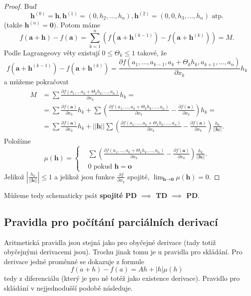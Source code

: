 \documentclass[../main.tex]{subfiles}
\begin{document}
\begin{proof}
	Buď
	\[\textbf{h}^{(0)} = \textbf{h}, \textbf{h}^{(1)} = (0, h_2,...,h_n), \textbf{h}^{(2)} = (0,0,h_3,...,h_n) \textrm{ atp.} \]
	(takže $\textbf{h}^{(n)} = \textbf{0})$.
	Potom máme
	\[f(\textbf{a}+\textbf{h}) - f(\textbf{a}) = \sum^n_{k=1}(f(\textbf{a}+\textbf{h}^{(k-1)})-f(\textbf{a}+\textbf{h}^{(k)})) = M.\]
	Podle Lagrangeovy věty existují $0 \leq \Theta_k \leq 1$ takové, že
	\[f(\textbf{a}+\textbf{h}^{(k-1)})-f(\textbf{a}+\textbf{h}^{(k)}) = \frac{\partial f(a_1,...,a_{k-1},a_k+ \Theta_kh_k,a_{k+1},...,a_n)}{\partial x_k}h_k\]
	a můžeme pokračovat
	\begin{align*} 
		\begin{split}
			M & = \sum\frac{\partial f(a_1,...a_k+\Theta_kh_k,...,a_n)}{\partial x_k}h_k = \\
			 & = \sum \frac{\partial f(\textbf{a})}{\partial x_k}h_k + \sum \left( \frac{\partial f(a_1,...,a_k+\Theta_kh_k,...,a_n)}{\partial x_k}
			 - \frac{\partial f(\textbf{a})}{\partial x_k} \right)h_k = \\
			 & = \sum \frac{\partial f(\textbf{a})}{\partial x_k}h_k + ||\textbf{h}||\sum\left(\frac{\partial f(a_1,...,a_k+\Theta_kh_k,...,a_n)}
			 {\partial x_k}- \frac{\partial f(\textbf{a})}{\partial x_k}\right)\frac{h_k}{||\textbf{h}||}.
		\end{split}
	\end{align*}
	Položíme
	\[\mu (\textbf{h}) =
	    \begin{cases} & \sum\left(\frac{\partial f(a_1,...,a_k+\Theta_kh_k,...,a_n)}{\partial x_k} -
	    \frac{\partial f(\textbf{a})}{\partial x_k} \right)\frac{h_k}{||\textbf{h}||}.\\
	    & 0 \text{ pokud } \mathbf{h} = \mathbf{o}
	    \end{cases}\]
	Jelikož $\left|\frac{h_k}{||\textbf{h}||}\right| \leq 1$ a jelikož jsou funkce $\frac{\partial f}{\partial x_k}$ spojité,
	$\lim_{\textbf{h}\rightarrow \textbf{0}} \mu (\textbf{h}) = 0$.
\end{proof}

\begin{consequence}
	Můžeme tedy schematicky psát \textbf{spojité PD $\implies$ TD $\implies$ PD}.
\end{consequence}


\subsection{Pravidla pro počítání parciálních derivací}
Aritmetická pravidla jsou stejná jako pro obyčejné derivace (tady totiž obyčejnými derivacemi jsou).
Trochu jinak tomu je u pravidla pro skládání. Pro derivace jedné proměnné se dokazuje z formule
\[ f(a+h) - f(a) = Ah + |h|\mu (h) \]
tedy z diferenciálu (který je pro ně totéž jako existence derivace).
Pravidlo pro skládání v nejjednodušší podobě následuje.
\end{document}
